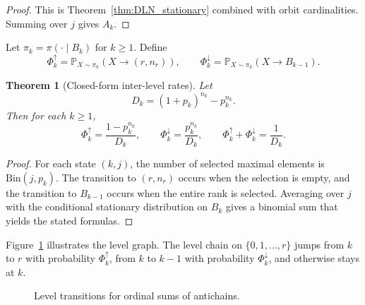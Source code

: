 \documentclass[final,3p,times]{elsarticle}
\newtheorem{theorem}{Theorem}[section]
\theoremstyle{definition}
\newcommand{\PP}{\mathbb{P}}
\begin{document}
\begin{proof}
This is Theorem~\ref{thm:DLN_stationary} combined with orbit cardinalities.
Summing over $j$ gives $A_k$.
\end{proof}

Let $\pi_k=\pi(\cdot\mid B_k)$ for $k\ge 1$.
Define
\[
\Phi_k^\uparrow = \PP_{X\sim\pi_k}(X\to (r,n_r)),
\qquad
\Phi_k^\downarrow = \PP_{X\sim\pi_k}(X\to B_{k-1}).
\]

\begin{theorem}[Closed-form inter-level rates]\label{thm:ordinal_exit_rates}
Let
\[
D_k = (1+p_k)^{n_k}-p_k^{n_k}.
\]
Then for each $k\ge 1$,
\[
\Phi_k^\uparrow = \frac{1-p_k^{n_k}}{D_k},
\qquad
\Phi_k^\downarrow = \frac{p_k^{n_k}}{D_k},
\qquad
\Phi_k^\uparrow+\Phi_k^\downarrow = \frac{1}{D_k}.
\]
\end{theorem}

\begin{proof}
For each state $(k,j)$, the number of selected maximal elements is $\mathrm{Bin}(j,p_k)$.
The transition to $(r,n_r)$ occurs when the selection is empty, and the transition to $B_{k-1}$ occurs when the entire rank is selected.
Averaging over $j$ with the conditional stationary distribution on $B_k$ gives a binomial sum that yields the stated formulas.
\end{proof}

Figure~\ref{fig:level_chain} illustrates the level graph.
The level chain on $\{0,1,\dots,r\}$ jumps from $k$ to $r$ with probability $\Phi_k^\uparrow$, from $k$ to $k-1$ with probability $\Phi_k^\downarrow$, and otherwise stays at $k$.

\begin{figure}[h]
\centering
{}
\caption{Level transitions for ordinal sums of antichains.}
\label{fig:level_chain}
\end{figure}
\end{document}
